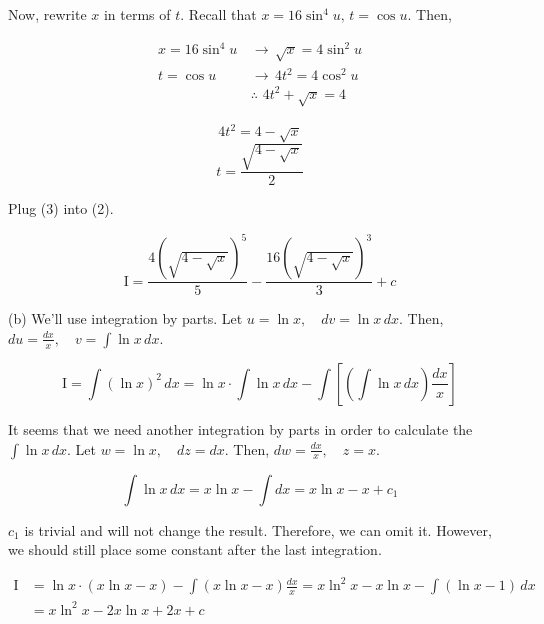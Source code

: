 \documentclass{article}
\begin{document}
\hfill

\noindent Now, rewrite $x$ in terms of $t$. Recall that $x=16\sin^4u, \, t=\cos u$. Then,

\begin{align*}
x=16\sin^4u \,&\rightarrow\, \sqrt{x} = 4\sin^2u\\
t=\cos u \,&\rightarrow\, 4t^2 = 4\cos^2u\\
&\therefore\,\, 4t^2 +\sqrt{x} = 4
\end{align*}

\begin{equation*}4t^2 = 4-\sqrt{x}\end{equation*}
\begin{equation}t=\frac{\sqrt{4-\sqrt{x}}}{2}\end{equation}

\hfill

\noindent Plug (3) into (2).

\begin{equation*}\boxed{\mathrm{I} = \frac{4\left(\sqrt{4-\sqrt{x}}\right)^5}{5}-\frac{16\left(\sqrt{4-\sqrt{x}}\right)^3}{3} + c}\end{equation*}

\hfill

\noindent (b) We'll use integration by parts. Let $u=\ln x,\quad dv = \ln x\,dx$. Then, $\displaystyle du = \frac{dx}{x}, \quad v = \int \ln x\, dx$.

\begin{equation*}
\mathrm{I} = \int(\ln x)^2 \, dx = \ln x \cdot \int \ln x\, dx - \int\left[\left(\int \ln x\, dx\right)\frac{dx}{x}\right]
\end{equation*}

\hfill

\noindent It seems that we need another integration by parts in order to calculate the $\displaystyle \int\ln x\,dx$. Let $w=\ln x,\quad dz = dx$. Then, $\displaystyle dw = \frac{dx}{x}, \quad z = x$.

\begin{equation*}
\int\ln x \, dx =x\ln x -\int{dx} = x\ln x -x +c_1
\end{equation*}

\hfill

\noindent $c_1$ is trivial and will not change the result. Therefore, we can omit it. However, we should still place some constant after the last integration.

\begin{align*}
\mathrm{I} &= \ln x \cdot(x \ln x - x) -\int(x\ln x - x)\frac{dx}{x} = x\ln^2x -x\ln x -\int(\ln x - 1)\, dx\\&=\boxed{x\ln^2x - 2x\ln x +2x + c}
\end{align*}
\end{document}
